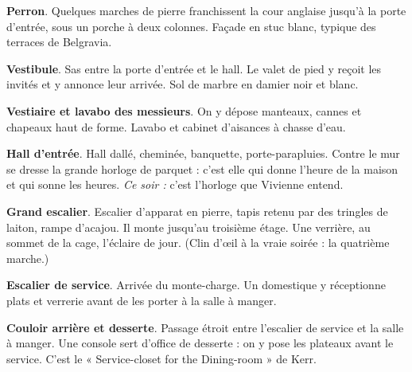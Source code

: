 \documentclass[10pt,a4paper]{article}
\begin{document}
\begin{minipage}[t]{8.75cm}
\end{minipage}\hfill\begin{minipage}[t]{8.95cm}\vspace{0pt}\fontsize{8.4}{10.2}\selectfont
\begin{descr}
\item[\textbf{R0}] \textbf{Perron}. Quelques marches de pierre franchissent la cour anglaise jusqu'à la porte d'entrée, sous un porche à deux colonnes. Façade en stuc blanc, typique des terraces de Belgravia.
\item[\textbf{R1}] \textbf{Vestibule}. Sas entre la porte d'entrée et le hall. Le valet de pied y reçoit les invités et y annonce leur arrivée. Sol de marbre en damier noir et blanc.
\item[\textbf{R2}] \textbf{Vestiaire et lavabo des messieurs}. On y dépose manteaux, cannes et chapeaux haut de forme. Lavabo et cabinet d'aisances à chasse d'eau.
\item[\textbf{R3}] \textbf{Hall d'entrée}. Hall dallé, cheminée, banquette, porte-parapluies. Contre le mur se dresse la grande horloge de parquet : c'est elle qui donne l'heure de la maison et qui sonne les heures. \textit{Ce soir :} c'est l'horloge que Vivienne entend.
\item[\textbf{R4}] \textbf{Grand escalier}. Escalier d'apparat en pierre, tapis retenu par des tringles de laiton, rampe d'acajou. Il monte jusqu'au troisième étage. Une verrière, au sommet de la cage, l'éclaire de jour. (Clin d'œil à la vraie soirée : la quatrième marche.)
\item[\textbf{R5}] \textbf{Escalier de service}. Arrivée du monte-charge. Un domestique y réceptionne plats et verrerie avant de les porter à la salle à manger.
\item[\textbf{R6}] \textbf{Couloir arrière et desserte}. Passage étroit entre l'escalier de service et la salle à manger. Une console sert d'office de desserte : on y pose les plateaux avant le service. C'est le « Service-closet for the Dining-room » de Kerr.

\end{descr}
\end{minipage}
\end{document}
